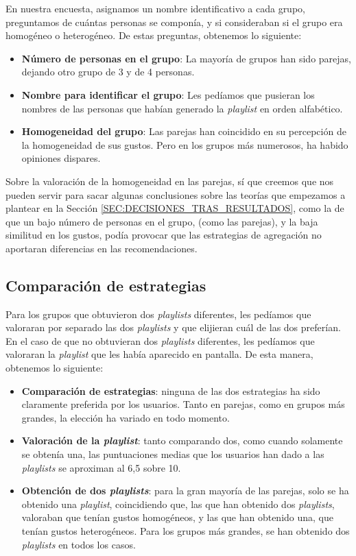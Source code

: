 En nuestra encuesta, asignamos un nombre identificativo a cada grupo, preguntamos de cuántas personas se componía, 
y si consideraban si el grupo era homogéneo o heterogéneo. De estas preguntas, obtenemos lo siguiente:

\begin{itemize}
    \item \textbf{Número de personas en el grupo}: La mayoría de grupos han sido parejas, dejando otro grupo de 3 y de 4 personas.
    \item \textbf{Nombre para identificar el grupo}: Les pedíamos que pusieran los nombres de las personas que habían generado la \textit{playlist} en orden alfabético.
    \item \textbf{Homogeneidad del grupo}: Las parejas han coincidido en su percepción de la homogeneidad de sus gustos. Pero en los grupos
    más numerosos, ha habido opiniones dispares.
\end{itemize}

Sobre la valoración de la homogeneidad en las parejas, sí que creemos que nos pueden servir para sacar algunas
conclusiones sobre las teorías que empezamos a plantear en la Sección \ref{SEC:DECISIONES_TRAS_RESULTADOS}, como la de que 
un bajo número de personas en el grupo, (como las parejas), y la baja similitud en los gustos, podía provocar que 
las estrategias de agregación no aportaran diferencias en las recomendaciones.

\subsection{Comparación de estrategias\label{SEC:COMPARACION_ESTRATEGIAS}}

Para los grupos que obtuvieron dos \textit{playlists} diferentes, les pedíamos que valoraran por separado las dos \textit{playlists} 
y que elijieran cuál de las dos preferían. En el caso de que no obtuvieran dos \textit{playlists} diferentes, les pedíamos que 
valoraran la \textit{playlist} que les había aparecido en pantalla. De esta manera, obtenemos lo siguiente:

\begin{itemize}
    \item \textbf{Comparación de estrategias}: ninguna de las dos estrategias ha sido claramente preferida por los usuarios. Tanto en parejas, 
    como en grupos más grandes, la elección ha variado en todo momento.
    \item \textbf{Valoración de la \textit{playlist}}: tanto comparando dos, como cuando solamente se obtenía una, las puntuaciones medias
    que los usuarios han dado a las \textit{playlists} se aproximan al 6,5 sobre 10.
    \item \textbf{Obtención de dos \textit{playlists}}: para la gran mayoría de las parejas, solo se ha obtenido una \textit{playlist}, coincidiendo
    que, las que han obtenido dos \textit{playlists}, valoraban que tenían gustos homogéneos, y las que han obtenido una, que tenían gustos heterogéneos.
    Para los grupos más grandes, se han obtenido dos \textit{playlists} en todos los casos.
\end{itemize}

